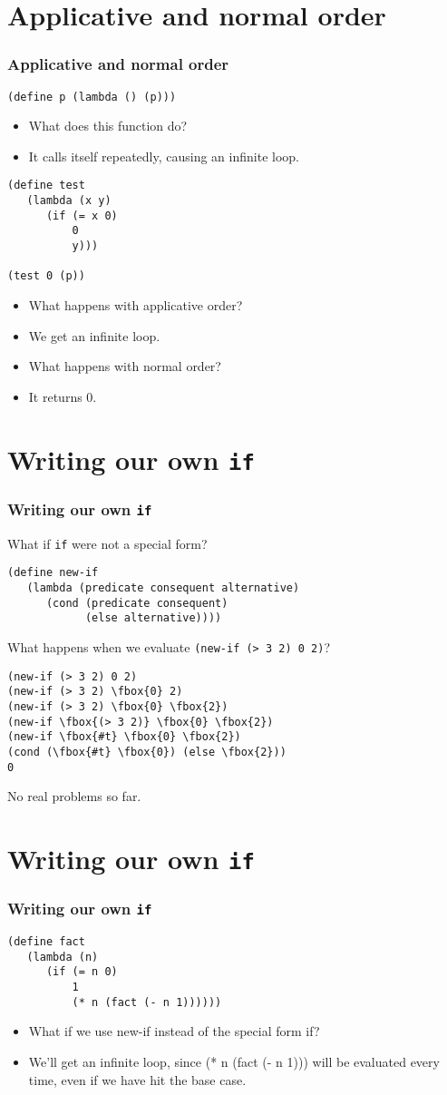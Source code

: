 \documentclass{beamer}
\newcommand{\bi}{\begin{itemize}}
\newcommand{\ii}{\item}
\newcommand{\ei}{\end{itemize}}
\newcommand{\sect}[1]{
\section{#1}
\begin{frame}[fragile]\frametitle{#1}
}
\begin{document}
\sect{Applicative and normal order}

\verb|(define p (lambda () (p)))|

\bi
\ii What does this function do?\pause
\ii It calls itself repeatedly, causing an infinite loop.\pause
\ei

\begin{Verbatim}
(define test 
   (lambda (x y)
      (if (= x 0) 
          0
          y)))

(test 0 (p))
\end{Verbatim}
\bi
\ii What happens with applicative order?\pause
\ii We get an infinite loop.\pause
\ii What happens with normal order?\pause
\ii It returns 0.
\ei
\end{frame}

\sect{Writing our own {\tt if}}

What if \verb|if| were not a special form?
\begin{Verbatim}
(define new-if
   (lambda (predicate consequent alternative)
      (cond (predicate consequent)
            (else alternative))))
\end{Verbatim}
What happens when we evaluate \verb|(new-if (> 3 2) 0 2)|?
\begin{Verbatim}[commandchars=\\\{\}]
(new-if (> 3 2) 0 2)
(new-if (> 3 2) \fbox{0} 2)
(new-if (> 3 2) \fbox{0} \fbox{2})
(new-if \fbox{(> 3 2)} \fbox{0} \fbox{2})
(new-if \fbox{#t} \fbox{0} \fbox{2})
(cond (\fbox{#t} \fbox{0}) (else \fbox{2}))
0
\end{Verbatim}
No real problems so far. 
\end{frame}

\sect{Writing our own \tt if}

\begin{Verbatim}
(define fact
   (lambda (n)
      (if (= n 0)
          1
          (* n (fact (- n 1))))))
\end{Verbatim}
\bi
\ii
What if we use new-if instead of the special form if?
\pause
\ii
We'll get an infinite loop, since (* n (fact (- n 1))) will be
evaluated every time, even if we have hit the base case. 
\ei

\end{frame}
\end{document}
